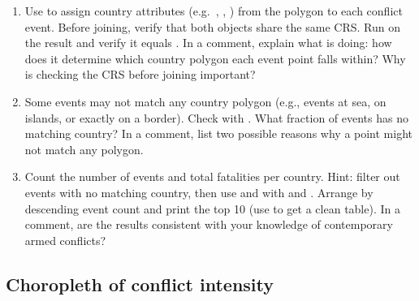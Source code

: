 \begin{enumerate}[label=\alph*)]
  \item Use  to assign country attributes (e.g.\ , , ) from the  polygon to each conflict event. Before joining, verify that both objects share the same CRS. Run  on the result and verify it equals . In a comment, explain what  is doing: how does it determine which country polygon each event point falls within? Why is checking the CRS before joining important?

  \item Some events may not match any country polygon (e.g., events at sea, on islands, or exactly on a border). Check with . What fraction of events has no matching country? In a comment, list two possible reasons why a point might not match any polygon.

  \item Count the number of events and total fatalities per country. Hint: filter out events with no matching country, then use  and  with  and . Arrange by descending event count and print the top 10 (use  to get a clean table). In a comment, are the results consistent with your knowledge of contemporary armed conflicts?
\end{enumerate}

\subsection{Choropleth of conflict intensity}

